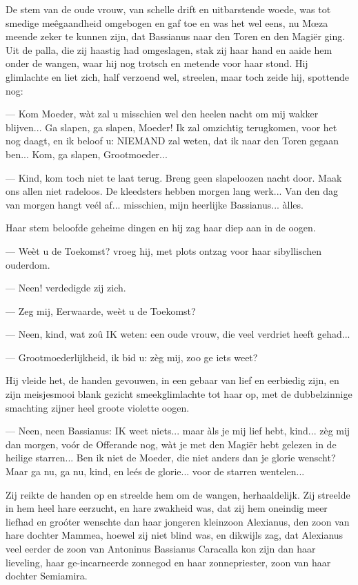 \documentclass[a4paper, 12pt, oneside, dutch]{article}
\begin{document}
De stem van de oude vrouw, van schelle drift en uitbarstende woede, was tot smedige meêgaandheid omgebogen en gaf toe en was het wel eens, nu Mœza meende zeker te kunnen zijn, dat Bassianus naar den Toren en den Magiër ging. Uit de palla, die zij haastig had omgeslagen, stak zij haar hand en aaide hem onder de wangen, waar hij nog trotsch en metende voor haar stond. Hij glimlachte en liet zich, half verzoend wel, streelen, maar toch zeide hij, spottende nog:

--- Kom Moeder, wàt zal u misschien wel den heelen nacht om mij wakker blijven... Ga slapen, ga slapen, Moeder! Ik zal omzichtig terugkomen, voor het nog daagt, en ik beloof u: NIEMAND zal weten, dat ik naar den Toren gegaan ben... Kom, ga slapen, Grootmoeder...

--- Kind, kom toch niet te laat terug. Breng geen slapeloozen nacht door. Maak ons allen niet radeloos. De kleedsters hebben morgen lang werk... Van den dag van morgen hangt veél af... misschien, mijn heerlijke Bassianus... àlles.

Haar stem beloofde geheime dingen en hij zag haar diep aan in de oogen.

--- Weèt u de Toekomst? vroeg hij, met plots ontzag voor haar sibyllischen ouderdom.

--- Neen! verdedigde zij zich.

--- Zeg mij, Eerwaarde, weèt u de Toekomst?

--- Neen, kind, wat zoû IK weten: een oude vrouw, die veel verdriet heeft gehad...

--- Grootmoederlijkheid, ik bid u: zèg mij, zoo ge iets weet?

Hij vleide het, de handen gevouwen, in een gebaar van lief en eerbiedig zijn, en zijn meisjesmooi blank gezicht smeekglimlachte tot haar op, met de dubbelzinnige smachting zijner heel groote violette oogen.

--- Neen, neen Bassianus: IK weet niets... maar àls je mij lief hebt, kind... zèg mij dan morgen, voór de Offerande nog, wàt je met den Magiër hebt gelezen in de heilige starren... Ben ik niet de Moeder, die niet anders dan je glorie wenscht? Maar ga nu, ga nu, kind, en leés de glorie... voor de starren wentelen...

Zij reikte de handen op en streelde hem om de wangen, herhaaldelijk. Zij streelde in hem heel hare eerzucht, en hare zwakheid was, dat zij hem oneindig meer liefhad en groóter wenschte dan haar jongeren kleinzoon Alexianus, den zoon van hare dochter Mammea, hoewel zij niet blind was, en dikwijls zag, dat Alexianus veel eerder de zoon van Antoninus Bassianus Caracalla kon zijn dan haar lieveling, haar ge-incarneerde zonnegod en haar zonnepriester, zoon van haar dochter Semiamira.
\end{document}
